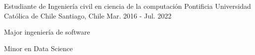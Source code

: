 

\begin{cventries}

  \cventry
  {Estudiante de Ingeniería civil en ciencia de la computación} %
  {Pontificia Universidad Católica de Chile} %
  {Santiago, Chile} %
  {Mar. 2016 - Jul. 2022} %
  {
    \begin{cvitems} %
      \item {Major ingeniería de software}
      \item {Minor en Data Science}
    \end{cvitems}
  }

\end{cventries}
